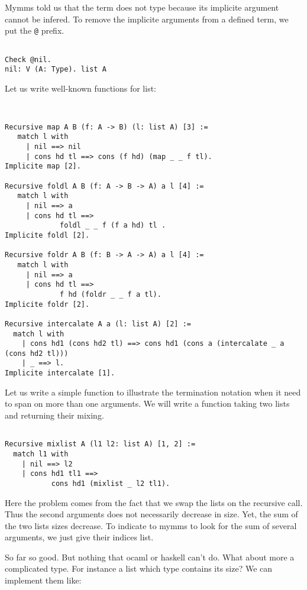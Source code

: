 \documentclass[a4paper,5pt,onecolumn]{article}
\begin{document}
Mymms told us that the term does not type because its implicite
argument cannot be infered. To remove the implicite arguments from a
defined term, we put the \texttt{@} prefix.

\begin{verbatim}

Check @nil.
nil: V (A: Type). list A

\end{verbatim}

Let us write well-known functions for list:

\begin{verbatim}


Recursive map A B (f: A -> B) (l: list A) [3] :=
   match l with
     | nil ==> nil
     | cons hd tl ==> cons (f hd) (map _ _ f tl).
Implicite map [2].

Recursive foldl A B (f: A -> B -> A) a l [4] :=
   match l with
     | nil ==> a
     | cons hd tl ==>
       	     foldl _ _ f (f a hd) tl .
Implicite foldl [2].

Recursive foldr A B (f: B -> A -> A) a l [4] :=
   match l with
     | nil ==> a
     | cons hd tl ==>
       	     f hd (foldr _ _ f a tl).
Implicite foldr [2].

Recursive intercalate A a (l: list A) [2] :=
  match l with
    | cons hd1 (cons hd2 tl) ==> cons hd1 (cons a (intercalate _ a (cons hd2 tl)))
    | _ ==> l.
Implicite intercalate [1].

\end{verbatim}

Let us write a simple function to illustrate the termination notation
when it need to span on more than one arguments. We will write a
function taking two lists and returning their mixing.

\begin{verbatim}

Recursive mixlist A (l1 l2: list A) [1, 2] :=
  match l1 with
    | nil ==> l2
    | cons hd1 tl1 ==>
      	   cons hd1 (mixlist _ l2 tl1).

\end{verbatim}

Here the problem comes from the fact that we swap the lists on the
recursive call. Thus the second arguments does not necessarily
decrease in size. Yet, the sum of the two lists sizes decrease. To
indicate to mymms to look for the sum of several arguments, we just
give their indices list.

So far so good. But nothing that ocaml or haskell can't do. What about
more a complicated type. For instance a list which type contains its
size? We can implement them like:
\end{document}
